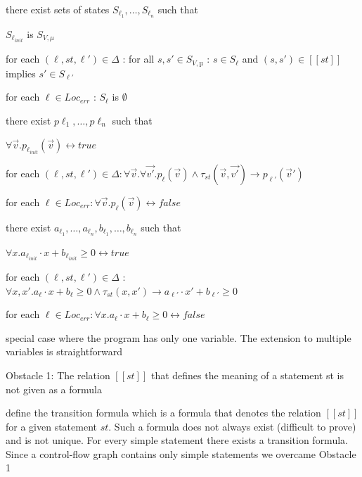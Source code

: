 \documentclass[landscape, a4paper]{article}
\begin{document}
\begin{minipage}[t]{0.2\linewidth}
\begin{betterlist}
\begin{betterlist}
\begin{betterlist}
			\end{betterlist}
			\item there exist sets of states $S_{\ell_1},\ldots , S_{\ell_n}$ such that
			\begin{betterlist}
				\item $S_{\ell_{init}}$ is $S_{V,\mu}$
				\item for each $(\ell, st, \ell') \in \Delta$ : for all $s, s' \in S_{V,µ}$ : $s \in S_{\ell}$ and $(s, s') \in [[st]]$ implies $s' \in S_{\ell'}$
				\item for each $\ell \in Loc_{err}$ : $S_{\ell}$ is $\emptyset$
			\end{betterlist}
			\item there exist $p{\ell_1},\ldots , p{\ell_n}$ such that
			\begin{betterlist}
				\item $\forall\vec{v}. p_{\ell_{init}}(\vec{v}) \leftrightarrow true$
				\item for each $(\ell, st, \ell') \in \Delta : \forall\vec{v}.\forall\vec{v'}.p_{\ell}(\vec{v}) \land \tau_{st}(\vec{v},\vec{v'}) \rightarrow p_{\ell'}(\vec{v}')$
				\item for each $\ell \in Loc_{err} : \forall\vec{v}. p_{\ell}(\vec{v}) \leftrightarrow false$
			\end{betterlist}
			\item there exist $a_{\ell_1},\ldots, a_{\ell_n}, b_{\ell_1},\ldots, b_{\ell_n}$ such that
			\begin{betterlist}
				\item $\forall x. a_{\ell_{init}} \cdot  x + b_{\ell_{init}} \geq 0 \leftrightarrow true$
				\item for each $(\ell, st, \ell') \in \Delta$ : $\forall x, x' . a_{\ell} \cdot  x + b_{\ell} \geq 0 \land \tau_{st}(x, x') \rightarrow a_{\ell'} \cdot x' + b_{\ell'} \geq 0$
				\item for each $\ell \in Loc_{err} : \forall x. a_{\ell} \cdot  x + b_{\ell} \geq 0 \leftrightarrow false$
				\item special case where the program has only one variable. The extension to multiple variables is straightforward
			\end{betterlist}
		\end{betterlist}
		\item \alert{Obstacle 1:} The relation $[[st]]$ that defines the meaning of a statement st is not given as a formula
		\begin{betterlist}
			\item define the transition formula which is a formula that denotes the relation $[[st]]$ for a given statement $st$. Such a formula does not always exist (difficult to prove) and is not unique. For every simple statement there exists a transition formula. Since a control-flow graph contains only simple statements we overcame Obstacle 1

\end{betterlist}
\end{betterlist}
\end{minipage}
\end{document}
